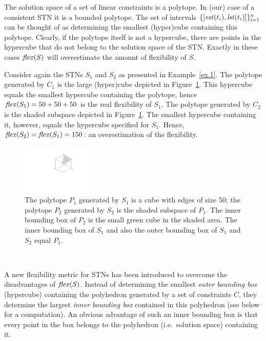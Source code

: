 The solution space of a set of linear constraints is a polytope. In (our) case of a consistent STN it is a bounded polytope. The set of intervals $\{ [\mathit{est}{(t_i)},\mathit{lst}{(t_i})]\}^n_{i=1}$ can be thought of as determining the smallest (hyper)cube containing this polytope. Clearly, if the polytope itself is not a hypercube, there are points in the hypercube that do not belong to the solution space of the STN. Exactly in these cases $\mathit{flex}(S)$ will overestimate the amount of flexibility of $S$. 
\begin{example}
Consider again the STNs $S_1$ and $S_2$ as presented in Example~\ref{ex.1}. 
The polytope generated by $C_1$ is the large (hyper)cube depicted in Figure~\ref{Fig1}. This hypercube equals the smallest hypercube containing the polytope, hence $\mathit{flex}(S_1)= 50 + 50+50$ is the real flexibility of $S_1$.
The polytope generated by $C_2$ is the shaded subspace depicted in Figure~\ref{Fig1}. The smallest hypercube containing it, however, equals the hypercube specified for $S_1$. Hence, $\mathit{flex}(S_2)= \mathit{flex}(S_1) =150$: an overestimation of the flexibility.

\begin{figure}
\centering
\includegraphics[width=0.3\textwidth]{chapter/icaps-flexibility/polytopes.pdf}
\caption{The polytope $P_1$ generated by $S_1$ is a cube with edges of size 50; the polytope $P_2$ generated by $S_2$ is the shaded subspace of $P_1$. The inner bounding box of $P_2$ is the small green cube in the shaded area. The inner bounding box of $S_1$ and also the outer bounding box of $S_1$ and $S_2$ equal $P_1$.}
\label{Fig1}
\end{figure}
\vspace{-0.8cm}\mbox{}\\
\end{example}
A new flexibility metric for STNs  \cite{wilson:2013} has been introduced to overcome the disadvantages of $\mathit{flex}(S)$.
Instead of determining the smallest \emph{outer bounding box} (hypercube) containing the polyhedron generated by a set of constraints $C$, they determine the largest \emph{inner bounding box} contained in this polyhedron (see below for a computation).
An obvious advantage of such an inner bounding box is that every point in the box belongs to the polyhedron (i.e.\ solution space) containing it.
